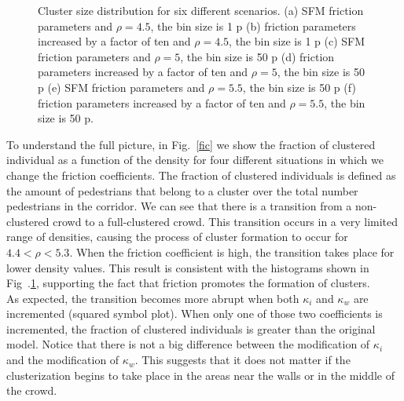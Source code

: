 \begin{figure}[!htbp]
\caption[width=0.47\columnwidth]{Cluster size distribution for six different scenarios. (a) SFM friction parameters and $\rho=4.5$, the bin size is 1 p (b) friction parameters increased by a factor of ten and $\rho=4.5$, the bin size is 1 p (c) SFM friction parameters and $\rho=5$, the bin size is 50 p (d) friction parameters increased by a factor of ten and $\rho=5$, the bin size is 50 p (e) SFM friction parameters and $\rho=5.5$, the bin size is 50 p (f) friction parameters increased by a factor of ten and $\rho=5.5$, the bin size is 50 p.}
\label{cluster_distribution}
\end{figure}

To understand the full picture, in Fig.~\ref{fic} we show the fraction of clustered individual as a function of the density for four different situations in which we change the friction coefficients. The fraction of clustered individuals is defined as the amount of pedestrians that belong to a cluster over the total number pedestrians in the corridor. 
We can see that there is a transition from a non-clustered crowd to a full-clustered crowd. This transition occurs in a very limited range of densities, causing the process of cluster formation to occur for $4.4<\rho<5.3$. When the friction coefficient is high, the transition takes place for lower density values. This result is consistent with the histograms shown in Fig~.\ref{cluster_distribution}, supporting the fact that friction promotes the formation of clusters. \\

As expected, the transition becomes more abrupt when both $\kappa_i$ and $\kappa_w$ are incremented (squared symbol plot). When only one of those two coefficients is incremented, the fraction of clustered individuals is greater than the original model. Notice that there is not a big difference between the modification of $\kappa_i$ and the modification of $\kappa_w$. This suggests that it does not matter if the clusterization begins to take place in the areas near the walls or in the middle of the crowd.\\


